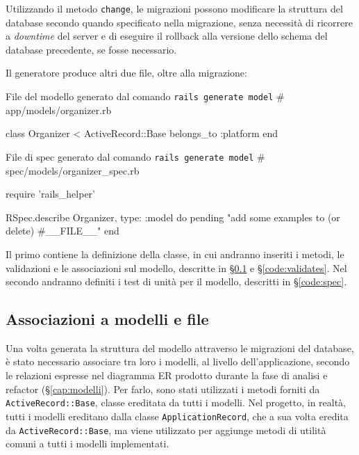 \noindent Utilizzando il metodo \verb|change|, le migrazioni possono modificare la struttura del database secondo quando specificato nella migrazione, senza necessità di ricorrere a \emph{downtime} del server e di eseguire il rollback alla versione dello schema del database precedente, se fosse necessario.

Il generatore produce altri due file, oltre alla migrazione:

\begin{code}{File del modello generato dal comando \texttt{rails generate model}}
# app/models/organizer.rb

class Organizer < ActiveRecord::Base
  belongs_to :platform
end
\end{code}

\begin{code}{File di spec generato dal comando \texttt{rails generate model}}
# spec/models/organizer_spec.rb

require 'rails_helper'

RSpec.describe Organizer, type: :model do
  pending "add some examples to (or delete) #{__FILE__}"
end
\end{code}

\noindent Il primo contiene la definizione della classe, in cui andranno inseriti i metodi, le validazioni e le associazioni sul modello, descritte in \S \ref{code:association} e \S \ref{code:validates}. Nel secondo andranno definiti i test di unità per il modello, descritti in \S \ref{code:spec}.

\subsection{Associazioni a modelli e file} \label{code:association}
Una volta generata la struttura del modello attraverso le migrazioni del database, è stato necessario associare tra loro i modelli, al livello dell'applicazione, secondo le relazioni espresse nel diagramma ER prodotto durante la fase di analisi e refactor (\S \ref{cap:modelli}). Per farlo, sono stati utilizzati i metodi forniti da \verb|ActiveRecord::Base|, classe ereditata da tutti i modelli. Nel progetto, in realtà, tutti i modelli ereditano dalla classe \verb|ApplicationRecord|, che a sua volta eredita da \verb|ActiveRecord::Base|, ma viene utilizzato per aggiunge metodi di utilità comuni a tutti i modelli implementati.

